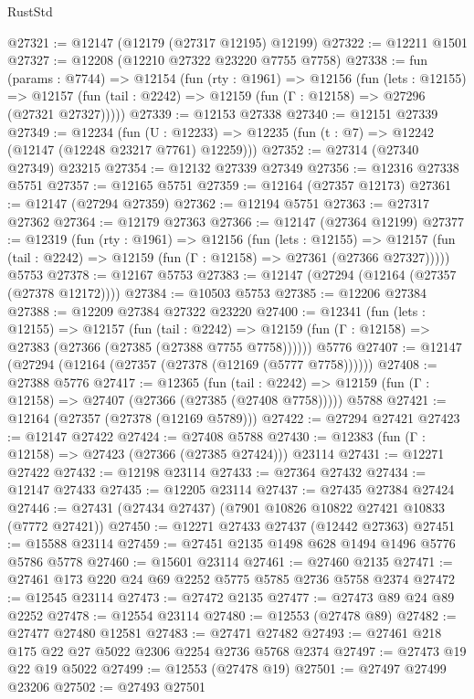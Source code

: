 \begin{lexlean}{RustStd}
\begin{coremodule}
@27321 := @12147 (@12179 (@27317 @12195) @12199)
@27322 := @12211 @1501
@27327 := @12208 (@12210 @27322 @23220 @7755 @7758)
@27338 := fun (params : @7744) =>
  @12154
    (fun (rty : @1961) =>
    @12156
      (fun (lets : @12155) =>
      @12157 (fun (tail : @2242) => @12159 (fun (Γ : @12158) => @27296 (@27321 @27327)))))
@27339 := @12153 @27338
@27340 := @12151 @27339
@27349 := @12234
    (fun (U : @12233) => @12235 (fun (t : @7) => @12242 (@12147 (@12248 @23217 @7761) @12259)))
@27352 := @27314 (@27340 @27349) @23215
@27354 := @12132 @27339 @27349
@27356 := @12316 @27338 @5751
@27357 := @12165 @5751
@27359 := @12164 (@27357 @12173)
@27361 := @12147 (@27294 @27359)
@27362 := @12194 @5751
@27363 := @27317 @27362
@27364 := @12179 @27363
@27366 := @12147 (@27364 @12199)
@27377 := @12319
    (fun (rty : @1961) =>
    @12156
      (fun (lets : @12155) =>
      @12157 (fun (tail : @2242) => @12159 (fun (Γ : @12158) => @27361 (@27366 @27327)))))
    @5753
@27378 := @12167 @5753
@27383 := @12147 (@27294 (@12164 (@27357 (@27378 @12172))))
@27384 := @10503 @5753
@27385 := @12206 @27384
@27388 := @12209 @27384 @27322 @23220
@27400 := @12341
    (fun (lets : @12155) =>
    @12157
      (fun (tail : @2242) =>
      @12159 (fun (Γ : @12158) => @27383 (@27366 (@27385 (@27388 @7755 @7758))))))
    @5776
@27407 := @12147 (@27294 (@12164 (@27357 (@27378 (@12169 (@5777 @7758))))))
@27408 := @27388 @5776
@27417 := @12365
    (fun (tail : @2242) => @12159 (fun (Γ : @12158) => @27407 (@27366 (@27385 (@27408 @7758)))))
    @5788
@27421 := @12164 (@27357 (@27378 (@12169 @5789)))
@27422 := @27294 @27421
@27423 := @12147 @27422
@27424 := @27408 @5788
@27430 := @12383 (fun (Γ : @12158) => @27423 (@27366 (@27385 @27424))) @23114
@27431 := @12271 @27422
@27432 := @12198 @23114
@27433 := @27364 @27432
@27434 := @12147 @27433
@27435 := @12205 @23114
@27437 := @27435 @27384 @27424
@27446 := @27431 (@27434 @27437) (@7901 @10826 @10822 @27421 @10833 (@7772 @27421))
@27450 := @12271 @27433 @27437 (@12442 @27363)
@27451 := @15588 @23114
@27459 := @27451 @2135 @1498 @628 @1494 @1496 @5776 @5786 @5778
@27460 := @15601 @23114
@27461 := @27460 @2135
@27471 := @27461 @173 @220 @24 @69 @2252 @5775 @5785 @2736 @5758 @2374
@27472 := @12545 @23114
@27473 := @27472 @2135
@27477 := @27473 @89 @24 @89 @2252
@27478 := @12554 @23114
@27480 := @12553 (@27478 @89)
@27482 := @27477 @27480 @12581
@27483 := @27471 @27482
@27493 := @27461 @218 @175 @22 @27 @5022 @2306 @2254 @2736 @5768 @2374
@27497 := @27473 @19 @22 @19 @5022
@27499 := @12553 (@27478 @19)
@27501 := @27497 @27499 @23206
@27502 := @27493 @27501

\end{coremodule}
\end{lexlean}
